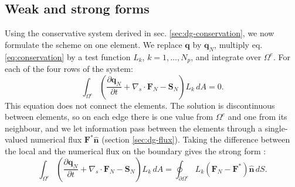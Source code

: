 \subsection{Weak and strong forms}\label{sec:dg-forms}
Using the conservative system derived in sec. \ref{sec:dg-conservation}, we now formulate the scheme on one element. We replace $\mathbf{q}$ by $\mathbf{q}_N$, multiply eq. \eqref{eq:conservation} by a test function $L_k$, $k = 1,\dots,N_p$, and integrate over $\Omega^e$. For each of the four rows of the system:
\begin{equation}\label{eq:dg-galerkin}
    \int_{\Omega^e}\left(\frac{\partial\mathbf{q}_N}{\partial t} + \nabla_s\cdot\mathbf{F}_N - \mathbf{S}_N\right)L_k\,dA = 0.
\end{equation}
This equation does not connect the elements. The solution is discontinuous between elements, so on each edge there is one value from $\Omega^e$ and one from its neighbour, and we let information pass between the elements through a single-valued numerical flux $\mathbf{F}^*\hat{\mathbf{n}}$ (section \ref{sec:dg-flux}). Taking the difference between the local and the numerical flux on the boundary gives the strong form \cite{GIRALDO2002499}:
\begin{equation}\label{eq:dg-strong}
    \int_{\Omega^e}\left(\frac{\partial\mathbf{q}_N}{\partial t} + \nabla_s\cdot\mathbf{F}_N - \mathbf{S}_N\right)L_k\,dA = \oint_{\partial\Omega^e}L_k\left(\mathbf{F}_N - \mathbf{F}^*\right)\hat{\mathbf{n}}\,dS.
\end{equation}

